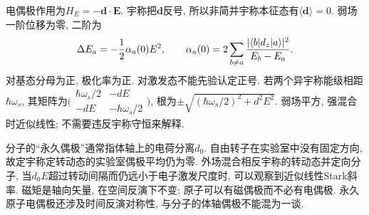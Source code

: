 电偶极作用为$H_E=-\mathbf d\cdot\mathbf E$. 宇称把$\mathbf d$反号, 所以非简并宇称本征态有$\langle\mathbf d\rangle=0$. 弱场一阶位移为零, 二阶为
\[\Delta E_a=-\frac12\alpha_a(0)E^2,\qquad\alpha_a(0)=2\sum_{b\ne a}\frac{|\langle b\rvert d_z\lvert a\rangle|^2}{E_b-E_a}.\]
对基态分母为正, 极化率为正. 对激发态不能先验认定正号. 若两个异宇称能级相距$\hbar\omega_s$, 其矩阵为$\bigl(\begin{smallmatrix}\hbar\omega_s/2&-dE\\-dE&-\hbar\omega_s/2\end{smallmatrix}\bigr)$, 根为$\pm\sqrt{(\hbar\omega_s/2)^2+d^2E^2}$. 弱场平方, 强混合时近似线性; 不需要违反宇称守恒来解释.

分子的“永久偶极”通常指体轴上的电荷分离$d_0$. 自由转子在实验室中没有固定方向, 故定宇称定转动态的实验室偶极平均仍为零. 外场混合相反宇称的转动态并定向分子, 当$d_0E$超过转动间隔而仍远小于电子激发尺度时, 可以观察到近似线性Stark斜率. 磁矩是轴向矢量, 在空间反演下不变; 原子可以有磁偶极而不必有电偶极. 永久原子电偶极还涉及时间反演对称性, 与分子的体轴偶极不能混为一谈.
